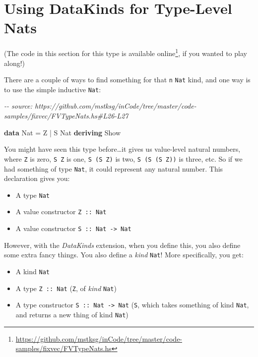 \documentclass[]{article}
\newenvironment{Shaded}{}{}
\newcommand{\CommentTok}[1]{\textcolor[rgb]{0.38,0.63,0.69}{\textit{#1}}}
\newcommand{\DataTypeTok}[1]{\textcolor[rgb]{0.56,0.13,0.00}{#1}}
\newcommand{\KeywordTok}[1]{\textcolor[rgb]{0.00,0.44,0.13}{\textbf{#1}}}
\newcommand{\OperatorTok}[1]{\textcolor[rgb]{0.40,0.40,0.40}{#1}}
\newcommand{\OtherTok}[1]{\textcolor[rgb]{0.00,0.44,0.13}{#1}}
\renewcommand{\href}[2]{#2\footnote{\url{#1}}}
\begin{document}
\hypertarget{using-datakinds-for-type-level-nats}{%
\section{Using DataKinds for Type-Level
Nats}\label{using-datakinds-for-type-level-nats}}

(The code in this section for this type is
\href{https://github.com/mstksg/inCode/tree/master/code-samples/fixvec/FVTypeNats.hs}{available
online}, if you wanted to play along!)

There are a couple of ways to find something for that \texttt{n} \texttt{Nat}
kind, and one way is to use the simple inductive \texttt{Nat}:

\begin{Shaded}
\begin{Highlighting}[]
\CommentTok{{-}{-} source: https://github.com/mstksg/inCode/tree/master/code{-}samples/fixvec/FVTypeNats.hs\#L26{-}L27}

\KeywordTok{data} \DataTypeTok{Nat} \OtherTok{=} \DataTypeTok{Z} \OperatorTok{|} \DataTypeTok{S} \DataTypeTok{Nat}
         \KeywordTok{deriving} \DataTypeTok{Show}
\end{Highlighting}
\end{Shaded}

You might have seen this type before\ldots it gives us value-level natural
numbers, where \texttt{Z} is zero, \texttt{S\ Z} is one, \texttt{S\ (S\ Z)} is
two, \texttt{S\ (S\ (S\ Z))} is three, etc. So if we had something of type
\texttt{Nat}, it could represent any natural number. This declaration gives you:

\begin{itemize}
\tightlist
\item
  A type \texttt{Nat}
\item
  A value constructor \texttt{Z\ ::\ Nat}
\item
  A value constructor \texttt{S\ ::\ Nat\ -\textgreater{}\ Nat}
\end{itemize}

However, with the \emph{DataKinds} extension, when you define this, you also
define some extra fancy things. You also define a \emph{kind} \texttt{Nat}! More
specifically, you get:

\begin{itemize}
\tightlist
\item
  A kind \texttt{Nat}
\item
  A type \texttt{Z\ ::\ Nat} (\texttt{Z}, of \emph{kind} \texttt{Nat})
\item
  A type constructor \texttt{S\ ::\ Nat\ -\textgreater{}\ Nat} (\texttt{S},
  which takes something of kind \texttt{Nat}, and returns a new thing of kind
  \texttt{Nat})
\end{itemize}
\end{document}
